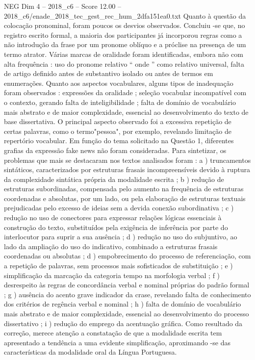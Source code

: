 \begin{textsample}{NEG Dim 4 – 2018\_c6 – Score 12.00 – 2018\_c6/enade\_2018\_tec\_gest\_rec\_hum\_2dfa151ea0.txt}
Quanto à questão da colocação pronominal, foram poucos os desvios observados.
Concluiu -se que, no registro escrito formal, a maioria dos participantes já incorporou regras como a não introdução da frase por um pronome oblíquo e a próclise na presença de um termo atrator.
Várias marcas de oralidade foram identificadas, embora não com alta frequência : uso do pronome relativo “ onde ” como relativo universal, falta de artigo definido antes de substantivo isolado ou antes de termos em enumerações.
Quanto aos aspectos vocabulares, alguns tipos de inadequação foram observados : expressões da oralidade ; seleção vocabular incompatível com o contexto, gerando falta de inteligibilidade ; falta de domínio de vocabulário mais abstrato e de maior complexidade, essencial ao desenvolvimento do texto de base dissertativa.
O principal aspecto observado foi a excessiva repetição de certas palavras, como o termo"pessoa", por exemplo, revelando limitação de repertório vocabular.
Em função do tema solicitado na Questão 1, diferentes grafias da expressão fake news não foram consideradas.
Para sintetizar, os problemas que mais se destacaram nos textos analisados foram : a ) truncamentos sintáticos, caracterizados por estruturas frasais incompreensíveis devido à ruptura da complexidade sintática própria da modalidade escrita ; b ) redução de estruturas subordinadas, compensada pelo aumento na frequência de estruturas coordenadas e absolutas, por um lado, ou pela elaboração de estruturas textuais prejudicadas pelo excesso de ideias sem a devida conexão subordinativa ; c ) redução no uso de conectores para expressar relações lógicas essenciais à construção do texto, substituídos pela exigência de inferência por parte do interlocutor para suprir a sua ausência ; d ) redução no uso do subjuntivo, ao lado da ampliação do uso do indicativo, combinado a estruturas frasais coordenadas ou absolutas ; d ) empobrecimento do processo de referenciação, com a repetição de palavras, sem processos mais sofisticados de substituição ; e ) simplificação da marcação da categoria tempo na morfologia verbal ; f ) desrespeito às regras de concordância verbal e nominal próprias do padrão formal ; g ) ausência do acento grave indicador da crase, revelando falta de conhecimento dos critérios de regência verbal e nominal ; h ) falta de domínio de vocabulário mais abstrato e de maior complexidade, essencial ao desenvolvimento do processo dissertativo ; i ) redução do emprego da acentuação gráfica.
Como resultado da correção, merece atenção a constatação de que a modalidade escrita tem apresentado a tendência a uma evidente simplificação, aproximando -se das características da modalidade oral da Língua Portuguesa.

\end{textsample}
